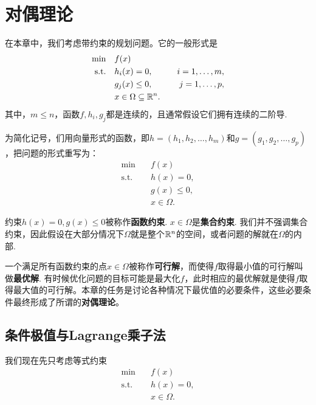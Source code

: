 \chapter{对偶理论}\label{chap:duality}

在本章中，我们考虑带约束的规划问题。它的一般形式是
        \begin{alignat*}{2}
        \min\quad&f({x}) \\
        \text{s.t.}\quad&h_i({x})=0,&\quad i=1,\dots,m,\\
        &g_j(x)\leq 0,&\quad j=1,\dots,p,\\
        &x\in\Omega\subseteq\mathbb{R}^n.
        \end{alignat*}
其中，$m\le n$，函数$f,h_i,g_j$都是连续的，且通常假设它们拥有连续的二阶导. 

为简化记号，们用向量形式的函数，即${h}=(h_1,h_2,\dots,h_m)$和${g}=(g_1,g_2,\dots,g_p)$，把问题的形式重写为：
    \begin{align*}
        \min\quad& f({x}) \\
        \text{s.t.}\quad& {h}({x})={0},\\
        & {g}({x})\le {0}, \\
        & {x} \in \Omega.
    \end{align*}

约束${h}({x})={0},{g}({x})\le{0}$被称作\textbf{函数约束}. ${x}\in\Omega$是\textbf{集合约束}. 我们并不强调集合约束，因此假设在大部分情况下$\Omega$就是整个$\mathbb{R}^n$的空间，或者问题的解就在$\Omega$的内部. 

一个满足所有函数约束的点${x}\in\Omega$被称作\textbf{可行解}，而使得$f$取得最小值的可行解叫做\textbf{最优解}. 有时候优化问题的目标可能是最大化$f$，此时相应的最优解就是使得$f$取得最大值的可行解。本章的任务是讨论各种情况下最优值的必要条件，这些必要条件最终形成了所谓的\textbf{对偶理论}。

\section{条件极值与Lagrange乘子法}
我们现在先只考虑等式约束
\begin{equation}
\begin{aligned}
        \min\quad& f({x}) \\
        \text{s.t.}\quad& {h}({x})={0},\\
        & {x} \in \Omega.
\end{aligned}    \label{eq:eq-constraint-only-differentiable}
\end{equation}

